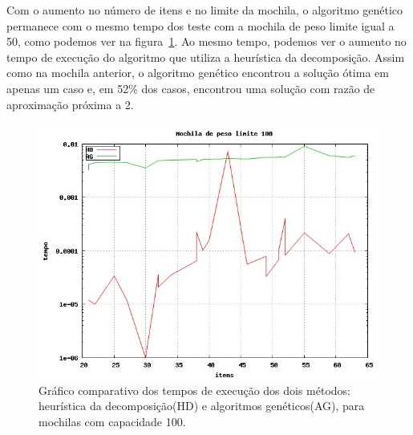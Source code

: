 Com o aumento no número de itens e no limite da mochila, o algoritmo genético permanece com o mesmo tempo dos teste com a mochila de peso limite igual a 50, como podemos ver na figura~\ref{fig:com_w100}. Ao mesmo tempo, podemos ver o aumento no tempo de execução do algoritmo que utiliza a heurística da decomposição. Assim como na mochila anterior, o algoritmo genético encontrou a solução ótima em apenas um caso e, em 52\% dos casos, encontrou uma solução com razão de aproximação próxima a 2.

\begin{figure}[htp]
	\centering
	\includegraphics[scale=0.4]{images/com_w100.jpg}
	\caption{Gráfico comparativo dos tempos de execução dos dois métodos: heurística da decomposição(HD) e algoritmos genéticos(AG), para mochilas com capacidade 100.}
	\label{fig:com_w100}
\end{figure}


